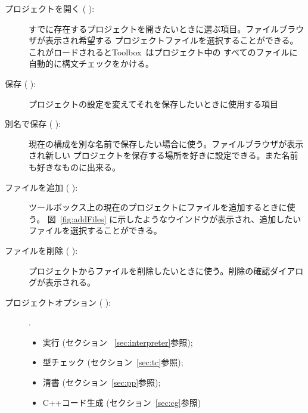 \documentclass[\pformat,12pt]{article}
\newcommand{\Toolbox}{Toolbox}
\newcommand{\Toolbox}{Toolbox}
\newcommand{\guicmd}[1]{{\sf #1}}
\newcommand{\guicmd}[1]{{\gt #1}}
\begin{document}
\begin{description}
\item[\guicmd{プロジェクトを開く} (\hspace{-1.2mm}
\hspace{.6mm}):]
  すでに存在するプロジェクトを開きたいときに選ぶ項目。ファイルブラウザが表示され希望する
  プロジェクトファイルを選択することができる。これがロードされると\Toolbox\ はプロジェクト中の
  すべてのファイルに自動的に構文チェックをかける。

\item[\guicmd{保存} (\hspace{-1.8mm}
):]
  プロジェクトの設定を変えてそれを保存したいときに使用する項目

\item[\guicmd{別名で保存} (\hspace{-1.5mm}
):]
  現在の構成を別な名前で保存したい場合に使う。ファイルブラウザが表示され新しい
  プロジェクトを保存する場所を好きに設定できる。また名前も好きなものに出来る。

\item[\guicmd{ファイルを追加} (\hspace{-1.5mm}
):] 
  ツールボックス上の現在のプロジェクトにファイルを追加するときに使う。
  図~\ref{fig:addFiles} に示したようなウインドウが表示され、追加したいファイルを選択することができる。

\item[\guicmd{ファイルを削除} (\hspace{-1.5mm}
 ):]
 プロジェクトからファイルを削除したいときに使う。削除の確認ダイアログが表示される。

\item[\guicmd{プロジェクトオプション} (\hspace{-1.5mm}
):].
  \begin{itemize}
    \item \guicmd{実行} (セクション ~\ref{sec:interpreter}参照);
    \item \guicmd{型チェック}  (セクション~\ref{sec:tc}参照);
    \item \guicmd{清書}  (セクション~\ref{sec:pp}参照);
    \item \guicmd{C++コード生成} (セクション~\ref{sec:cg}参照)


\end{itemize}
\end{description}
\end{document}
